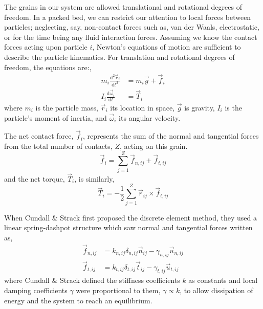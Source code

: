 \documentclass[11pt]{report} %
\newcommand{\dt}[1]{
\frac{\mathrm{d}{#1}}{\mathrm{d}t}}
\newcommand{\ddt}[1]{
\frac{\mathrm{d}^2{#1}}{\mathrm{d}t^2}}
\begin{document}
The grains in our system are allowed translational and rotational degrees of freedom. In a packed bed, we can restrict our attention to local forces between particles; neglecting, say, non-contact forces such as, van der Waals, electrostatic, or for the time being any fluid interaction forces. Assuming we know the contact forces acting upon particle $i$, Newton's equations of motion are sufficient to describe the particle kinematics. For translation and rotational degrees of freedom, the equations are:,
\begin{subequations}\label{eq:newtons-second}
\begin{align}
	m_i  \ddt{\vec{r}_i}   & = m_i\vec{g} + \vec{f}_i \label{eq:newton-translational} \\
	I_i\dt{\vec{\omega}_i} & = \vec{T}_i \label{eq:newton-rotational}
\end{align}
\end{subequations}
where $m_i$ is the particle mass, $\vec{r}_i$ its location in space, $\vec{g}$ is gravity, $I_i$ is the particle's moment of inertia, and $\vec{\omega}_i$ its angular velocity.

The net contact force, $\vec{f}_i$, represents the sum of the normal and tangential forces from the total number of contacts, $Z$, acting on this grain.
\begin{equation}
 	\vec{f}_i = \sum_{j=1}^{Z} \vec{f}_{n,ij} + \vec{f}_{t,ij}
 \end{equation} 
and the net torque, $\vec{T}_i$, is similarly,
\begin{equation}
	\vec{T}_i = -\frac{1}{2}\sum_{j=1}^{Z} \vec{r}_{ij} \times \vec{f}_{t,ij}
\end{equation}

When Cundall \& Strack first proposed the discrete element method, they used a linear spring-dashpot structure which saw normal and tangential forces written as,
\begin{subequations}
\label{eq:dem-forces}
\begin{align}
	\vec{f}_{n,ij} &= k_{n,ij} \delta_{n,ij}\vec{n}_{ij} - \gamma_{n,ij} \vec{u}_{n,ij} 	\label{eq:normal-force} \\
	\vec{f}_{t,ij} &= k_{t,ij} \delta_{t,ij}\vec{t}_{ij} - \gamma_{t,ij} \vec{u}_{t,ij} 	\label{eq:tangential-force}
\end{align}
\end{subequations}
where Cundall \& Strack defined the stiffness coefficients $k$ as constants and local damping coefficients $\gamma$ were proportional to them, $\gamma \propto k$, to allow dissipation of energy and the system to reach an equilibrium. 
\end{document}
